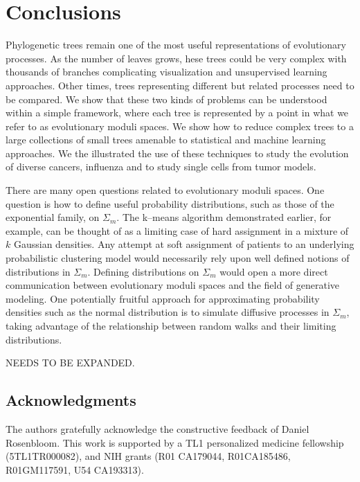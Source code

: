 \documentclass[a4paper,11pt]{article}
\begin{document}

\section{Conclusions}\label{sec:conclusions}

Phylogenetic trees remain one of the most useful representations of evolutionary processes.
As the number of leaves grows, hese trees could be very complex with thousands of branches complicating visualization and unsupervised learning approaches.
Other times, trees representing different but related processes need to be compared.
We show that these two kinds of problems can be understood within a simple framework, where each tree is represented by a point in what we refer to as evolutionary moduli spaces.
We show how to reduce complex trees to a large collections of small trees amenable to statistical and machine learning approaches.
We the illustrated the use of these techniques to study the evolution of diverse cancers, influenza and to study single cells from tumor models.

There are many open questions related to evolutionary moduli spaces.
One question is how to define useful probability distributions, such as those of the exponential family, on $\Sigma_m$.
The k--means algorithm demonstrated earlier, for example, can be thought of as a limiting case of hard assignment in a mixture of $k$ Gaussian densities.
Any attempt at soft assignment of patients to an underlying probabilistic clustering model would necessarily rely upon well defined notions of distributions in $\Sigma_m$.
Defining distributions on $\Sigma_m$ would open a more direct communication between evolutionary moduli spaces and the field of generative modeling.
One potentially fruitful approach for approximating probability densities such as the normal distribution is to simulate diffusive processes in $\Sigma_m$, taking advantage of the relationship between random walks and their limiting distributions.

NEEDS TO BE EXPANDED.


\subsection*{Acknowledgments}

The authors gratefully acknowledge the constructive feedback of Daniel Rosenbloom.
This work is supported by a TL1 personalized medicine fellowship (5TL1TR000082), and NIH grants (R01 CA179044, R01CA185486, R01GM117591, U54 CA193313).



\end{document}
